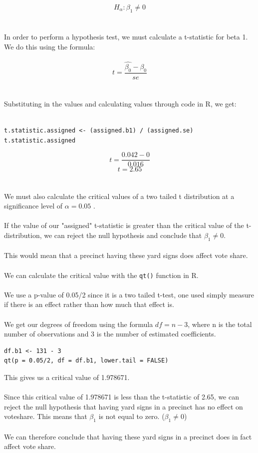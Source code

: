 \documentclass[12pt,letterpaper]{article}
\begin{document}
\begin{enumerate}
\[H_\alpha: \beta_1  \neq  0\]
\\\\
\noindent In order to perform a hypothesis test, we must calculate a t-statistic for beta 1. We do this using the formula:
\\\\
\[ t= \frac{\hat{\beta_0} - \beta_0}{se} \]
\\\\
\noindent Substituting in the values and calculating values through code in R, we get:
\\\\
\begin{lstlisting}
t.statistic.assigned <- (assigned.b1) / (assigned.se)
t.statistic.assigned
\end{lstlisting}
\[ t= \frac{0.042 -0}{0.016} \]
\[t = 2.65\]
\\\\
\noindent We must also calculate the critical values of a two tailed t distribution at a significance level of $\alpha = 0.05$ .
\\\\
\noindent If the value of our "assigned" t-statistic is greater than the critical value of the t-distribution, we can reject the null hypothesis and conclude that $\beta_1 \neq 0$.
\\\\
\noindent This would mean that a precinct having these yard signs does affect vote share.
\\\\
\noindent We can calculate the critical value with the \texttt{qt()} function in R.
\\\\
\noindent We use a p-value of 0.05/2 since it is a two tailed t-test, one used simply measure if there is an effect rather than how much that effect is. 
\\\\
\noindent We get our degrees of freedom using the formula $df = n-3$, where n is the total number of observations and 3 is the number of estimated coefficients.

\begin{lstlisting}
df.b1 <- 131 - 3
qt(p = 0.05/2, df = df.b1, lower.tail = FALSE)
\end{lstlisting}

\noindent This gives us a critical value of 1.978671.
\\\\
\noindent Since this critical value of 1.978671 is less than the t-statistic of 2.65, we can reject the null hypothesis that having yard signs in a precinct has no effect on voteshare. This means that $\beta_1$ is not equal to zero. ($\beta_1 \neq 0$)
\\\\
\noindent We can therefore conclude that having these yard signs in a precinct does in fact affect vote share. 



\end{enumerate}
\end{document}
